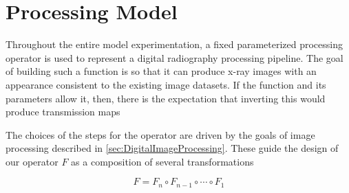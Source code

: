 \documentclass[nomenclature, english, bibtex]{kththesis}
\numberwithin{listing}{chapter}
\begin{document}
\section{Processing Model}

Throughout the entire model experimentation, a fixed parameterized processing operator is used to represent a
digital radiography processing pipeline. The goal of building such a function is so that it can produce
x-ray images with an appearance consistent to the existing image datasets. If the function and its parameters
allow it, then, there is the expectation that inverting this would produce transmission maps

The choices of the steps for the operator are driven by the goals of image processing described
in \autoref{sec:DigitalImageProcessing}. These guide the design of our operator $F$ as a composition
of several transformations

\begin{equation}
F = F_n \circ F_{n-1} \circ \cdots \circ F_1
\end{equation}
\end{document}
